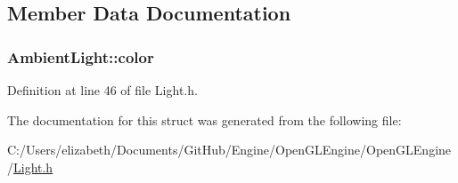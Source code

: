 \subsection{Member Data Documentation}
\subsubsection[{\texorpdfstring{color}{color}}]{ Ambient\+Light\+::color}\hypertarget{struct_ambient_light_af89096906b189fc10a3960b6e5f9b44c}{}\label{struct_ambient_light_af89096906b189fc10a3960b6e5f9b44c}


Definition at line 46 of file Light.\+h.



The documentation for this struct was generated from the following file\+:\begin{DoxyCompactItemize}
\item 
C\+:/\+Users/elizabeth/\+Documents/\+Git\+Hub/\+Engine/\+Open\+G\+L\+Engine/\+Open\+G\+L\+Engine/\hyperlink{_light_8h}{Light.\+h}\end{DoxyCompactItemize}
